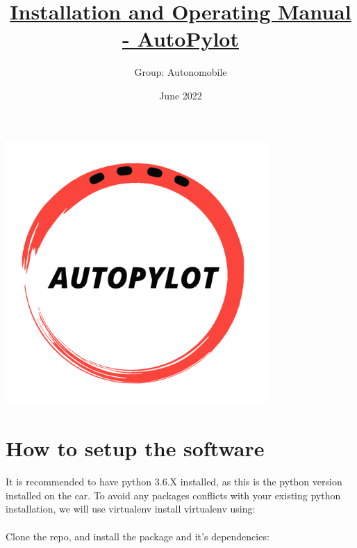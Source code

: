 \documentclass[12pt]{article}
\begin{document}
\title{\underline{Installation and Operating Manual  - AutoPylot}}
\date{June 2022}


\author{%
    Group: Autonomobile 
    }

\maketitle

\centerline{\includegraphics[height=10cm]{../../logos/logo-transparent-black.png}}
\newpage

\tableofcontents
\newpage
\section{How to setup the software}

It is recommended to have python 3.6.X installed, as this is the python version installed on the car.
To avoid any packages conflicts with your existing python installation, we will use virtualenv install virtualenv using:\\

\noindent{}\\

Clone the repo, and install the package and it's dependencies:\\

\noindent{}\\
\end{document}
